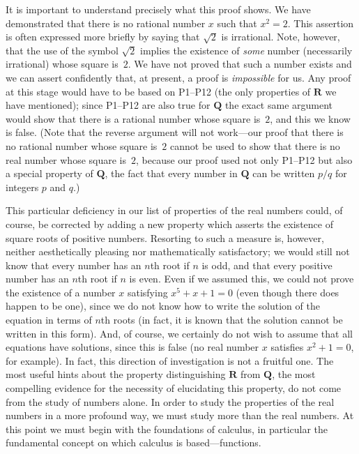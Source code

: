 It is important to understand precisely what this proof shows. We have
demonstrated that there is no rational number $x$ such that $x^2 = 2$. This
assertion is often expressed more briefly by saying that $\sqrt{2}$ is
irrational. Note, however, that the use of the symbol $\sqrt{2}$ implies the
existence of \emph{some} number (necessarily irrational) whose square is~$2$.
We have not proved that such a number exists and we can assert confidently
that, at present, a proof is \emph{impossible} for us. Any proof at this
stage would have to be based on P1--P12 (the only properties of $\mathbf{R}$
we have mentioned); since P1--P12 are also true for $\mathbf{Q}$ the exact
same argument would show that there is a rational number whose square is~$2$,
and this we know is false. (Note that the reverse argument will not
work---our proof that there is no rational number whose square is~$2$ cannot
be used to show that there is no real number whose square is~$2$, because our
proof used not only P1--P12 but also a special property of $\mathbf{Q}$, the
fact that every number in $\mathbf{Q}$ can be written $p/q$ for integers $p$
and $q$.)

This particular deficiency in our list of properties of the real numbers
could, of course, be corrected by adding a new property which asserts the
existence of square roots of positive numbers. Resorting to such a measure
is, however, neither aesthetically pleasing nor mathematically satisfactory;
we would still not know that every number has an $n$th root if $n$ is odd, and
that every positive number has an $n$th root if $n$ is even. Even if we
assumed this, we could not prove the existence of a number $x$ satisfying
$x^5 + x + 1 = 0$ (even though there does happen to be one), since we do not
know how to write the solution of the equation in terms of $n$th roots (in
fact, it is known that the solution cannot be written in this form). And, of
course, we certainly do not wish to assume that all equations have solutions,
since this is false (no real number $x$ satisfies $x^2 + 1 = 0$, for example).
In fact, this direction of investigation is not a fruitful one. The most
useful hints about the property distinguishing $\mathbf{R}$ from
$\mathbf{Q}$, the most compelling evidence for the necessity of elucidating
this property, do not come from the study of numbers alone. In order to study
the properties of the real numbers in a more profound way, we must study more
than the real numbers. At this point we must begin with the foundations of
calculus, in particular the fundamental concept on which calculus is
based---functions.

